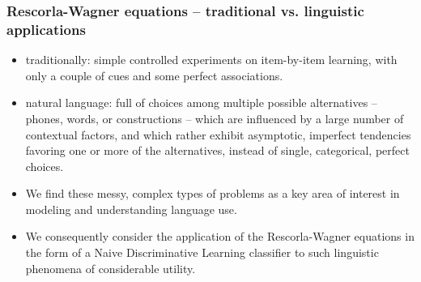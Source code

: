 \begin{frame}
  \frametitle{Rescorla-Wagner equations -- traditional vs. linguistic
    applications}

  \begin{itemize}

  \item traditionally: simple controlled experiments on item-by-item
    learning, with only a couple of cues and some perfect associations.

  \item natural language: full of choices among multiple possible
    alternatives -- phones, words, or constructions -- which are
    influenced by a large number of contextual factors, and which
    rather exhibit asymptotic, imperfect tendencies favoring one or
    more of the alternatives, instead of single, categorical, perfect
    choices.

  \item We find these messy, complex types of problems as a key area
    of interest in modeling and understanding language use.

  \item We consequently consider the application of the
    Rescorla-Wagner equations in the form of a Naive Discriminative
    Learning classifier to such linguistic phenomena of considerable
    utility.
    
\end{itemize}

\end{frame}

